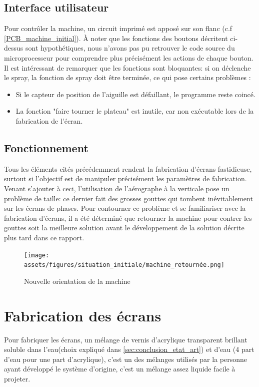 \newpage
\subsection{Interface utilisateur}
Pour contrôler la machine, un circuit imprimé est apposé sur son flanc (c.f \autoref{PCB_machine_initial}).
À noter que les fonctions des boutons décritent ci-dessus sont hypothétiques, nous n'avons pas pu retrouver le code
source du microprocesseur pour comprendre plus précisément les actions de chaque bouton. Il est intéressant de remarquer
que les fonctions sont bloquantes: si on déclenche le spray, la fonction de spray doit être terminée, ce qui pose certains problèmes :

\begin{itemize}
    \item Si le capteur de position de l'aiguille est défaillant, le programme reste coincé.
    \item La fonction "faire tourner le plateau" est inutile, car non exécutable lors de la fabrication de l'écran.
\end{itemize}

\subsection{Fonctionnement}

Tous les éléments cités précédemment rendent la fabrication d'écrans fastidieuse, surtout si l'objectif est de manipuler précisément les paramètres de fabrication.
Venant s'ajouter à ceci, l'utilisation de l'aérographe à la verticale pose un problème de taille: ce dernier fait des grosses gouttes qui tombent inévitablement sur
les écrans de phases. Pour contourner ce problème et se familiariser avec la fabrication d'écrans, il a été déterminé que retourner la machine pour contrer les gouttes
soit la meilleure solution avant le développement de la solution décrite plus tard dans ce rapport.

\begin{figure}[H]
    \centering
    \texttt{[image: assets/figures/situation\_initiale/machine\_retournée.png]}
    \caption{Nouvelle orientation de la machine}
\end{figure}

\newpage
\section{Fabrication des écrans}
Pour fabriquer les écrans, un mélange de vernis d'acrylique transparent brillant soluble dans l'eau(choix expliqué dans \autoref{sec:conclusion_etat_art}) et d'eau (4 part d'eau pour une part d'acrylique),
c'est un des mélanges utilisés par la personne ayant développé le système d'origine, c'est un mélange assez liquide facile à projeter.

